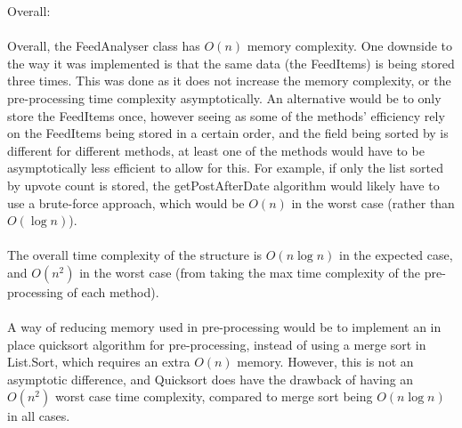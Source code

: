 \documentclass{article}
\begin{document}
	Overall: \\ \\
	Overall, the FeedAnalyser class has $O(n)$ memory complexity. One downside to the way it was implemented is that the same data (the FeedItems) is being stored three times. This was done as it does not increase the memory complexity, or the pre-processing time complexity asymptotically. An alternative would be to only store the FeedItems once, however seeing as some of the methods' efficiency rely on the FeedItems being stored in a certain order, and the field being sorted by is different for different methods, at least one of the methods would have to be asymptotically less efficient to allow for this. For example, if only the list sorted by upvote count is stored, the getPostAfterDate algorithm would likely have to use a brute-force approach, which would be $O(n)$ in the worst case (rather than $O(\log n)$). \\ \\
	The overall time complexity of the structure is $O(n \log n)$ in the expected case, and $O(n^2)$ in the worst case (from taking the max time complexity of the pre-processing of each method). \\ \\
	A way of reducing memory used in pre-processing would be to implement an in place quicksort algorithm for pre-processing, instead of using a merge sort in List.Sort, which requires an extra $O(n)$ memory. However, this is not an asymptotic difference, and Quicksort does have the drawback of having an $O(n^2)$ worst case time complexity, compared to merge sort being $O(n \log n)$ in all cases.
\end{document}
